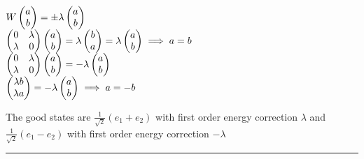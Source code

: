 \documentclass[14pt]{extarticle}
\makeatletter
\newenvironment{lefteqs}{%
    \begin{flushleft}%
    \renewcommand{\arraystretch}{1.3}%
    $\begin{array}{@{}l@{}}%
}{%
    \end{array}$%
    \end{flushleft}%
}
\makeatother
\begin{document}
\begin{lefteqs}
    W \begin{pmatrix} a \\ b \end{pmatrix} = \pm \lambda \begin{pmatrix} a \\ b \end{pmatrix} \\
    \begin{pmatrix} 0 & \lambda \\ \lambda & 0 \end{pmatrix} \begin{pmatrix} a \\ b \end{pmatrix} = \lambda \begin{pmatrix} b \\ a \end{pmatrix}
    = \lambda \begin{pmatrix} a \\ b \end{pmatrix} \implies a=b \\
    \begin{pmatrix} 0 & \lambda \\ \lambda & 0 \end{pmatrix} \begin{pmatrix} a \\ b \end{pmatrix} = -\lambda \begin{pmatrix} a \\ b \end{pmatrix} \\
    \begin{pmatrix} \lambda b \\ \lambda a \end{pmatrix} = -\lambda \begin{pmatrix} a \\ b \end{pmatrix} \implies a=-b
\end{lefteqs}

The good states are $\frac{1}{\sqrt{2}}(e_1 +  e_2)$ with first order energy correction $\lambda$
 and $\frac{1}{\sqrt{2}}(e_1 -  e_2)$ with first order energy correction $-\lambda$

\vspace{3em}
\hrule
\vspace{2em}
\end{document}
